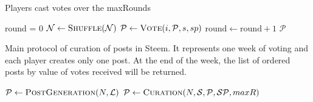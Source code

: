     \begin{algorithm}[H]
      \caption{Players cast votes over the maxRounds}
      \label{alg:curation}
      \begin{algorithmic}[1]
        \State round = 0
          \State $\mathcal{N} \leftarrow \textsc{Shuffle}(\mathcal{N})$
              \State $\mathcal{P} \leftarrow \textsc{Vote}(i,\mathcal{P}, s,sp)$
            \EndFor
          \State $\mathrm{round} \leftarrow \mathrm{round} + 1$
        \EndWhile
        \State \Return $\mathcal{P}$
      \EndFunction
      \end{algorithmic}
    \end{algorithm}

    \begin{algorithm}[H]
      \caption{Main protocol of curation of posts in Steem. It represents one
      week of voting and each player creates only one post. At the end of the
      week, the list of ordered posts by value of votes received will be
      returned.}
      \label{alg:Protocol}
      \begin{algorithmic}[1]
        \State $\mathcal{P} \leftarrow \textsc{PostGeneration}(N,\mathcal{L})$
        \State $\mathcal{P} \leftarrow
        \textsc{Curation}(N,\mathcal{S},\mathcal{P},\mathcal{SP}, maxR)$
        \State {}
      \EndFunction
      \end{algorithmic}
    \end{algorithm}
